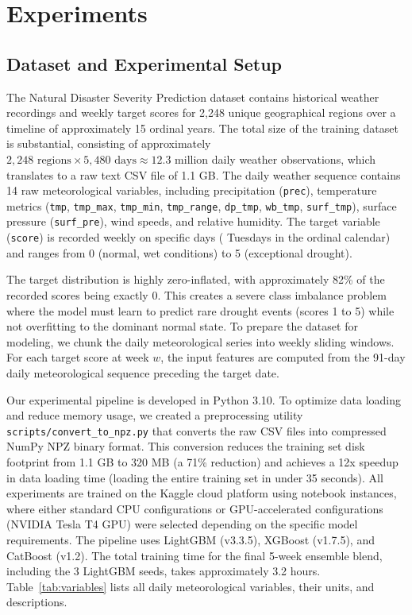\documentclass[conference]{IEEEtran}
\begin{document}
\section{Experiments}

\subsection{Dataset and Experimental Setup}
The Natural Disaster Severity Prediction dataset contains historical weather recordings and weekly target scores for 2,248 unique geographical regions over a timeline of approximately 15 ordinal years. The total size of the training dataset is substantial, consisting of approximately $2,248 \text{ regions} \times 5,480 \text{ days} \approx 12.3 \text{ million}$ daily weather observations, which translates to a raw text CSV file of 1.1 GB. The daily weather sequence contains 14 raw meteorological variables, including precipitation (\texttt{prec}), temperature metrics (\texttt{tmp}, \texttt{tmp\_max}, \texttt{tmp\_min}, \texttt{tmp\_range}, \texttt{dp\_tmp}, \texttt{wb\_tmp}, \texttt{surf\_tmp}), surface pressure (\texttt{surf\_pre}), wind speeds, and relative humidity. The target variable (\texttt{score}) is recorded weekly on specific days ( Tuesdays in the ordinal calendar) and ranges from 0 (normal, wet conditions) to 5 (exceptional drought). 

The target distribution is highly zero-inflated, with approximately 82\% of the recorded scores being exactly 0. This creates a severe class imbalance problem where the model must learn to predict rare drought events (scores 1 to 5) while not overfitting to the dominant normal state. To prepare the dataset for modeling, we chunk the daily meteorological series into weekly sliding windows. For each target score at week $w$, the input features are computed from the 91-day daily meteorological sequence preceding the target date. 

Our experimental pipeline is developed in Python 3.10. To optimize data loading and reduce memory usage, we created a preprocessing utility \texttt{scripts/convert\_to\_npz.py} that converts the raw CSV files into compressed NumPy NPZ binary format. This conversion reduces the training set disk footprint from 1.1 GB to 320 MB (a 71\% reduction) and achieves a 12x speedup in data loading time (loading the entire training set in under 35 seconds). All experiments are trained on the Kaggle cloud platform using notebook instances, where either standard CPU configurations or GPU-accelerated configurations (NVIDIA Tesla T4 GPU) were selected depending on the specific model requirements. The pipeline uses LightGBM (v3.3.5), XGBoost (v1.7.5), and CatBoost (v1.2). The total training time for the final 5-week ensemble blend, including the 3 LightGBM seeds, takes approximately 3.2 hours. Table~\ref{tab:variables} lists all daily meteorological variables, their units, and descriptions.
\end{document}
